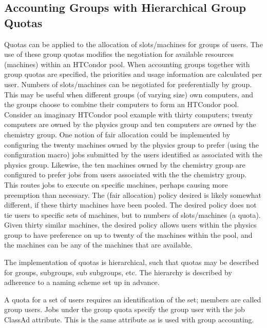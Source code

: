 \subsection{\label{sec:group-quotas}Accounting Groups with Hierarchical Group Quotas}

Quotas can be applied to the allocation of slots/machines
for groups of users.
The use of these group quotas modifies the negotiation for 
available resources (machines) within an HTCondor pool.
When accounting groups together with group quotas are specified,
the priorities and usage information are calculated per user.
Numbers of slots/machines can be negotiated for preferentially
by group.
This may be useful when
different groups (of varying size) own computers,
and the groups choose to combine their computers to
form an HTCondor pool.
Consider an imaginary HTCondor pool example with thirty computers;
twenty computers are owned by the physics group and ten
computers are owned by the chemistry group.
One notion of fair allocation could be implemented 
by configuring the twenty machines owned by the physics group
to prefer (using the  configuration macro)
jobs submitted by the users identified as associated
with the physics group.
Likewise, the ten machines owned by the chemistry group are
configured to prefer jobs from users associated with the
the chemistry group.
This routes jobs to execute on specific machines,
perhaps causing more preemption than necessary.
The (fair allocation) policy desired is likely somewhat different,
if these thirty machines have been pooled.
The desired policy does not tie users to specific sets of machines,
but to numbers of slots/machines (a quota).
Given thirty similar machines,
the desired policy allows users within the physics group to have
preference on up to twenty of the machines within the pool,
and the machines can be any of the machines that are available.

The implementation of quotas is hierarchical,
such that quotas may be described for groups, subgroups,
sub subgroups, etc.  
The hierarchy is described by adherence to a naming scheme
set up in advance.

A quota for a set of users requires an identification of
the set; members are called group users.
Jobs under the group quota
specify the group user with the 
 job ClassAd attribute.
This is the same attribute as is used with group accounting.

